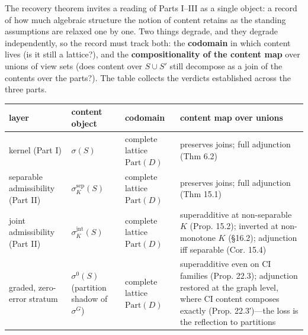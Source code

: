 
The recovery theorem invites a reading of Parts I--III as a single object: a record of how much algebraic structure the notion of content retains as the standing assumptions are relaxed one by one. Two things degrade, and they degrade independently, so the record must track both: the \textbf{codomain} in which content lives (is it still a lattice?), and the \textbf{compositionality of the content map} over unions of view sets (does content over \(S \cup S'\) still decompose as a join of the contents over the parts?). The table collects the verdicts established across the three parts.

{\def\LTcaptype{none} %
\begin{longtable}[]{@{}
  >{\raggedright\arraybackslash}p{}
  >{\raggedright\arraybackslash}p{}
  >{\raggedright\arraybackslash}p{}
  >{\raggedright\arraybackslash}p{}@{}}
\toprule\noalign{}
\begin{minipage}[b]{\linewidth}\raggedright
layer
\end{minipage} & \begin{minipage}[b]{\linewidth}\raggedright
content object
\end{minipage} & \begin{minipage}[b]{\linewidth}\raggedright
codomain
\end{minipage} & \begin{minipage}[b]{\linewidth}\raggedright
content map over unions
\end{minipage} \\
\midrule\noalign{}
\endhead
\bottomrule\noalign{}
\endlastfoot
kernel (Part I) & \(\sigma(S)\) & complete lattice \(\mathrm{Part}(D)\) & preserves joins; full adjunction (Thm 6.2) \\
separable admissibility (Part II) & \(\sigma^{\mathrm{sep}}_K(S)\) & complete lattice \(\mathrm{Part}(D)\) & preserves joins; full adjunction (Thm 15.1) \\
joint admissibility (Part II) & \(\sigma^{\mathrm{jnt}}_K(S)\) & complete lattice \(\mathrm{Part}(D)\) & superadditive at non-separable \(K\) (Prop. 15.2); inverted at non-monotone \(K\) (§16.2); adjunction iff separable (Cor. 15.4) \\
graded, zero-error stratum & \(\sigma^{0}(S)\) (partition shadow of \(\sigma^{G}\)) & complete lattice \(\mathrm{Part}(D)\) & superadditive even on CI families (Prop. 22.3); adjunction restored at the graph level, where CI content composes exactly (Prop. 22.3′)---\hspace{0pt}the loss is the reflection to partitions \\

\end{longtable}}
